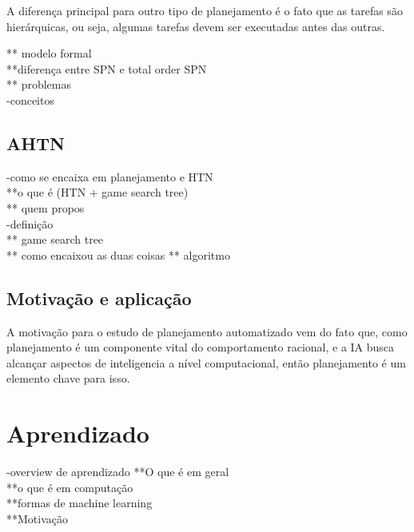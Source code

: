 A diferença principal para outro tipo de planejamento é o fato que as tarefas são hierárquicas, ou seja, algumas tarefas devem ser executadas antes das outras.

** modelo formal \\
**diferença entre SPN e total order SPN \\
** problemas \\

-conceitos \\

\subsection{AHTN} 
-como se encaixa em planejamento e HTN \\
**o que é (HTN + game search tree)\\
** quem propos\cite{ontanon2015adversarial} \\
-definição \\
** game search tree \\
** como encaixou as duas coisas
** algoritmo \\

\subsection{Motivação e aplicação}
A motivação para o estudo de planejamento automatizado vem do fato que, como planejamento é um componente vital do comportamento racional, e a IA busca alcançar aspectos de inteligencia a nível computacional, então planejamento é um elemento chave para isso\cite{ghallab2004automated}.

\section{Aprendizado} 
-overview de aprendizado
**O que é em geral \\
**o que é em computação \\
**formas de machine learning\\
**Motivação \\

